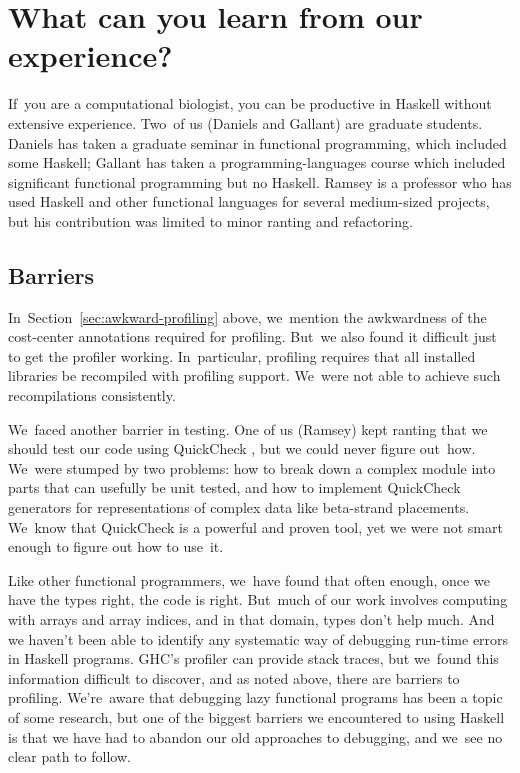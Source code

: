 \documentclass[preprint,nonatbib,blockstyle,nocopyrightspace,times]{sigplanconf}
\newcommand\secref[1]{Section~\ref{sec:#1}}
\let\cite\citep
\begin{document}
\section{What can you learn from our experience?}

If~you are a computational biologist, 
you can be productive in Haskell without extensive
experience.
Two~of us (Daniels and Gallant) are graduate students.
Daniels has taken a graduate seminar in functional programming, which
included some Haskell;
Gallant has taken a programming-languages course which included
significant functional programming but no Haskell.
Ramsey is a professor who has used Haskell and other functional
languages for several medium-sized projects,
but his contribution was limited to minor ranting and refactoring.


\subsection{Barriers}

In~\secref{awkward-profiling} above, we~mention the awkwardness of the
cost-center annotations required for profiling.
But~we also found it difficult just to get the profiler working.
In~particular, profiling requires that all installed libraries be recompiled
with profiling support.
We~were not able to achieve such recompilations consistently.


We~faced another barrier in testing.
One of us (Ramsey) kept ranting that we should test our code using 
QuickCheck \cite{claessen:quickcheck},
but we could never figure out~how.
We~were stumped by two problems:
how to break down a complex module into parts that can usefully be
unit tested,
and how to implement QuickCheck generators for representations of complex
data like beta-strand placements.
We~know that QuickCheck is a powerful and proven tool,
yet we were not smart enough to figure out how to use~it.

Like other functional programmers, we~have found that often enough,
once we have the types right, the code is right.
But~much of our work involves computing with arrays and array indices,
and in that domain, types don't help much.
And we haven't been able to identify any systematic way of debugging
run-time errors in Haskell programs.
GHC's profiler can provide stack traces, but we~found this information
difficult to discover, and as noted above,
there are barriers to profiling.
We're~aware that debugging lazy functional programs has been a topic
of some research,
but one of the biggest barriers we encountered to using Haskell is
that we have had to abandon our old approaches to debugging,
and we~see no clear path to follow.
\end{document}

